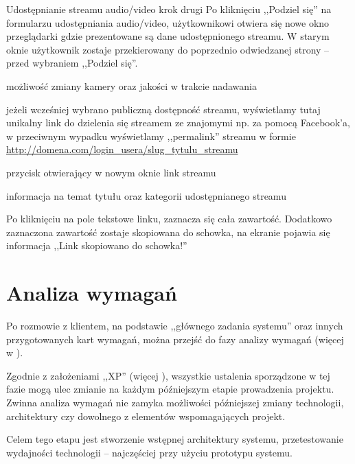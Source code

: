 \begin{userstory}{Udostępnianie streamu audio/video krok drugi}
    Po kliknięciu ,,Podziel się'' na formularzu udostępniania audio/video, użytkownikowi otwiera się nowe okno przeglądarki gdzie prezentowane są dane udostępnionego streamu. W starym oknie użytkownik zostaje przekierowany do poprzednio odwiedzanej strony -- przed wybraniem ,,Podziel się''.
    \begin{packed_enum}
        \item{możliwość zmiany kamery oraz jakości w trakcie nadawania}
        \item{jeżeli wcześniej wybrano publiczną dostępność streamu, wyświetlamy tutaj unikalny link do dzielenia się streamem ze znajomymi np. za pomocą Facebook'a, w przeciwnym wypadku wyświetlamy ,,permalink'' streamu w formie \url{http://domena.com/login_usera/slug_tytulu_streamu}}
        \item{przycisk otwierający w nowym oknie link streamu}
        \item{informacja na temat tytułu oraz kategorii udostępnianego streamu}
    \end{packed_enum}
    \begin{tests}
        \item{Po kliknięciu na pole tekstowe linku, zaznacza się cała zawartość. Dodatkowo zaznaczona zawartość zostaje skopiowana do schowka, na ekranie pojawia się informacja ,,Link skopiowano do schowka!''}
    \end{tests}
\end{userstory}

\section{Analiza wymagań}
\label{sec:EtapIaw}

Po rozmowie z klientem, na podstawie ,,głównego zadania systemu'' oraz innych przygotowanych kart wymagań, można przejść do fazy analizy wymagań (więcej w ).

Zgodnie z założeniami ,,XP'' (więcej ), wszystkie ustalenia sporządzone w tej fazie mogą ulec zmianie na każdym późniejszym etapie prowadzenia projektu. Zwinna analiza wymagań nie zamyka możliwości późniejszej zmiany technologii, architektury czy dowolnego z elementów wspomagających projekt.

Celem tego etapu jest stworzenie wstępnej architektury systemu, przetestowanie wydajności technologii -- najczęściej przy użyciu prototypu systemu.

